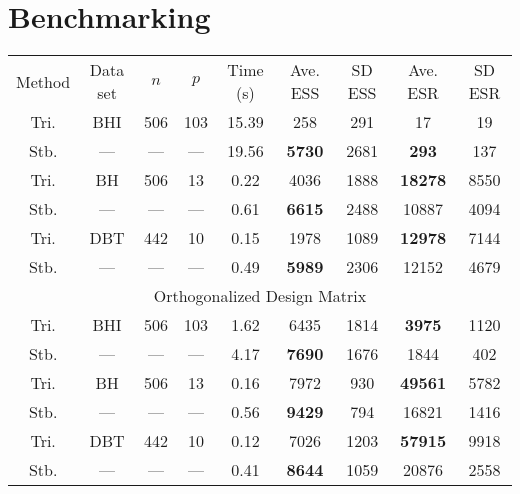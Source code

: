 \documentclass{article}
\begin{document}
\large %

\setcounter{section}{0}

\section{Benchmarking}

\begin{table}
\centering
\begin{tabular}{c c c c c c c c c}
Method & Data set & $n$ & $p$ & Time (s) & Ave. ESS & SD ESS & Ave. ESR & SD ESR \\
Tri. & BHI & 506 & 103 & 15.39 & 258  &  291 &    17 &  19 \\
Stb. & --- & --- & --- & 19.56 & {\bf 5730} & 2681 & {\bf 293} & 137 \\

Tri. & BH  & 506 & 13  &  0.22 & 4036 & 1888 & {\bf 18278} & 8550 \\ 
Stb. & --- & --- & --- &  0.61 & {\bf 6615} & 2488 & 10887 & 4094 \\

Tri. & DBT & 442 & 10  &  0.15 & 1978 & 1089 & {\bf 12978} & 7144 \\
Stb. & --- & --- & --- &  0.49 & {\bf 5989} & 2306 & 12152 & 4679 \\

\multicolumn{9}{c}{Orthogonalized Design Matrix} \\

Tri. & BHI & 506 & 103 &  1.62 & 6435 & 1814 &  {\bf 3975} & 1120 \\
Stb. & --- & --- & --- &  4.17 & {\bf 7690} & 1676 &  1844 &  402 \\

Tri. & BH  & 506 & 13  &  0.16 & 7972 &  930 & {\bf 49561} & 5782 \\ 
Stb. & --- & --- & --- &  0.56 & {\bf 9429} &  794 & 16821 & 1416 \\

Tri. & DBT & 442 & 10  &  0.12 & 7026 & 1203 & {\bf 57915} & 9918 \\
Stb. & --- & --- & --- &  0.41 & {\bf 8644} & 1059 & 20876 & 2558 \\

\end{tabular}
\end{table}
\end{document}
